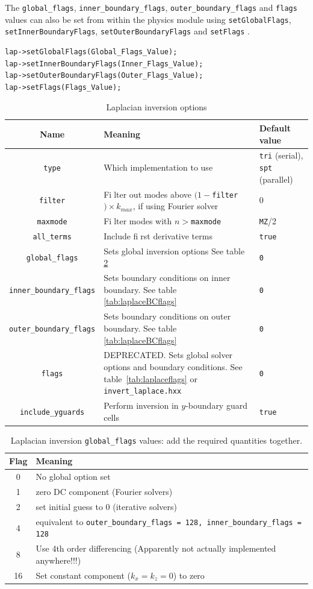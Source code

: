 \documentclass[12pt]{article}
\newcommand{\code}[1]{\texttt{#1}}
\begin{document}
The \code{global\_flags}, \code{inner\_boundary\_flags},
\code{outer\_boundary\_flags} and \code{flags} values can also be set from
within the physics module using
%
\lstinline!setGlobalFlags!,  \lstinline!setInnerBoundaryFlags!,
\lstinline!setOuterBoundaryFlags! and  \lstinline!setFlags!
%
.
%
\begin{lstlisting}
lap->setGlobalFlags(Global_Flags_Value);
lap->setInnerBoundaryFlags(Inner_Flags_Value);
lap->setOuterBoundaryFlags(Outer_Flags_Value);
lap->setFlags(Flags_Value);
\end{lstlisting}
%
\begin{table}
\caption{Laplacian inversion options}
%
\label{tab:laplacesettings}
%
\centering
%
\begin{tabular}[c]{c | p{8cm} | p{2.5cm}}
\hline
Name & Meaning & Default value\\
\hline
\code{type} & Which implementation to use & \code{tri} (serial),  \code{spt} 
(parallel) \\
\code{filter} & Fi􏰀lter out modes above $(1-$\code{filter}$)\times k_{max}$, 
if using Fourier solver & 0\\
\code{maxmode} & Fi􏰀lter modes with $n >$\code{maxmode} & \code{MZ}/2 \\
\code{all\_terms} & Include fi􏰀rst derivative terms & \code{true}\\
\code{global\_flags} & Sets global inversion options See table 
\ref{tab:laplaceglobalflags}& \code{0}\\
\code{inner\_boundary\_flags} & Sets boundary conditions on inner boundary.  
See table \ref{tab:laplaceBCflags} & \code{0}\\
\code{outer\_boundary\_flags} & Sets boundary conditions on outer boundary.  
See table \ref{tab:laplaceBCflags}& \code{0}\\
\code{flags} & DEPRECATED. Sets global solver options and boundary conditions.  
See table~\ref{tab:laplaceflags} or \code{invert\_laplace.hxx} & \code{0} \\
\code{include\_yguards} & Perform inversion in $y$-boundary guard
cells & \code{true}\\
\hline
\end{tabular}
%
\end{table}
%
\begin{table}
\caption{Laplacian inversion \code{global\_flags} values: add the required
quantities together.}
%
\label{tab:laplaceglobalflags}
%
\centering
%
\begin{tabular}[c]{c|l}
\hline
Flag & Meaning \\
\hline
0 &  No global option set \\
1 &  zero DC component (Fourier solvers) \\
2 &  set initial guess to 0 (iterative solvers) \\
4 &  equivalent to \code{outer\_boundary\_flags = 128, inner\_boundary\_flags = 
128}\\
8 & Use 4th order differencing (Apparently not actually implemented 
anywhere!!!) \\
16 & Set constant component ($k_x = k_z = 0$) to zero \\
\hline
\end{tabular}
%
\end{table}
\end{document}
